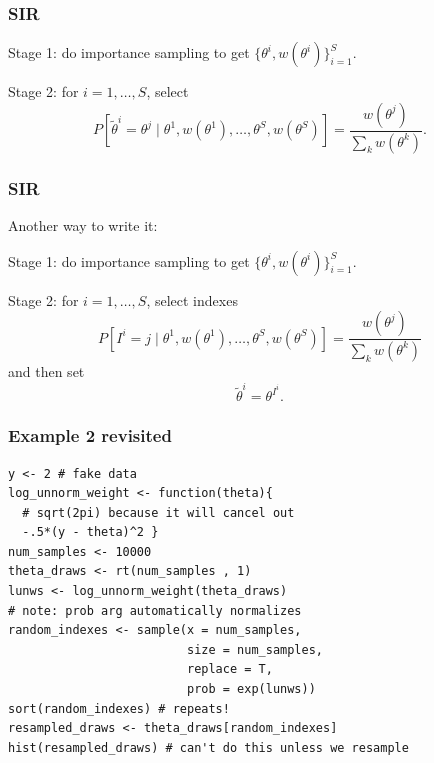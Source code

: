 \documentclass{beamer}
\begin{document}
\begin{frame}[fragile]
\frametitle{SIR}


Stage 1: do importance sampling to get $\{ \theta^i, w(\theta^i) \}_{i=1}^S$.
\newline

Stage 2: for $i = 1, \ldots, S$, select 
$$
P[ \tilde{\theta}^i = \theta^j \mid \theta^1, w(\theta^1), \ldots, \theta^S, w(\theta^S) ] = \frac{w(\theta^j)}{ \sum_k w(\theta^k) }.
$$

\end{frame}

\begin{frame}[fragile]
\frametitle{SIR}

Another way to write it:
\newline

Stage 1: do importance sampling to get $\{ \theta^i, w(\theta^i) \}_{i=1}^S$.
\newline

Stage 2: for $i = 1, \ldots, S$, select indexes
$$
P[ I^i = j \mid \theta^1, w(\theta^1), \ldots, \theta^S, w(\theta^S) ] = \frac{w(\theta^j)}{ \sum_k w(\theta^k) }
$$
and then set 
$$
\tilde{\theta}^i = \theta^{I^i}.
$$

\end{frame}


\begin{frame}[fragile]
\frametitle{Example 2 revisited}

\begin{verbatim}
y <- 2 # fake data
log_unnorm_weight <- function(theta){ 
  # sqrt(2pi) because it will cancel out 
  -.5*(y - theta)^2 }
num_samples <- 10000
theta_draws <- rt(num_samples , 1)
lunws <- log_unnorm_weight(theta_draws)
# note: prob arg automatically normalizes
random_indexes <- sample(x = num_samples, 
                         size = num_samples, 
                         replace = T, 
                         prob = exp(lunws)) 
sort(random_indexes) # repeats!
resampled_draws <- theta_draws[random_indexes]
hist(resampled_draws) # can't do this unless we resample
\end{verbatim}

\end{frame}


\end{document}
